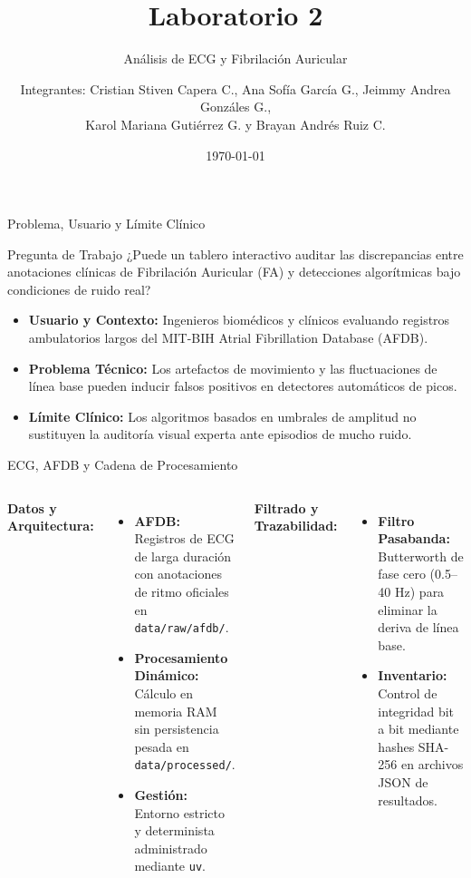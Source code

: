 \documentclass[aspectratio=169]{beamer}
\title{Laboratorio 2}
\subtitle{Análisis de ECG y Fibrilación Auricular}
\author{Integrantes: Cristian Stiven Capera C., Ana Sofía García G., Jeimmy Andrea Gonzáles G.,\\
Karol Mariana Gutiérrez G. y Brayan Andrés Ruiz C.}
\date{\today}
\begin{document}
\begin{frame}
    \titlepage
\end{frame}

\begin{frame}{Problema, Usuario y Límite Clínico}
    \begin{block}{Pregunta de Trabajo}
        ¿Puede un tablero interactivo auditar las discrepancias entre anotaciones clínicas de Fibrilación Auricular (FA) y detecciones algorítmicas bajo condiciones de ruido real?
    \end{block}
    \begin{itemize}
        \small
        \item \textbf{Usuario y Contexto:} Ingenieros biomédicos y clínicos evaluando registros ambulatorios largos del MIT-BIH Atrial Fibrillation Database (AFDB).
        \item \textbf{Problema Técnico:} Los artefactos de movimiento y las fluctuaciones de línea base pueden inducir falsos positivos en detectores automáticos de picos.
        \item \textbf{Límite Clínico:} Los algoritmos basados en umbrales de amplitud no sustituyen la auditoría visual experta ante episodios de mucho ruido.
    \end{itemize}
\end{frame}

\begin{frame}{ECG, AFDB y Cadena de Procesamiento}
    \begin{columns}[T]
        \textbf{Datos y Arquitectura:}
        \begin{itemize}
            \small
            \item \textbf{AFDB:} Registros de ECG de larga duración con anotaciones de ritmo oficiales en \texttt{data/raw/afdb/}.
            \item \textbf{Procesamiento Dinámico:} Cálculo en memoria RAM sin persistencia pesada en \texttt{data/processed/}.
            \item \textbf{Gestión:} Entorno estricto y determinista administrado mediante \texttt{uv}.
        \end{itemize}
        
        \textbf{Filtrado y Trazabilidad:}
        \begin{itemize}
            \small
            \item \textbf{Filtro Pasabanda:} Butterworth de fase cero (0.5--40 Hz) para eliminar la deriva de línea base.
            \item \textbf{Inventario:} Control de integridad bit a bit mediante hashes SHA-256 en archivos JSON de resultados.
        \end{itemize}
    \end{columns}
\end{frame}
\end{document}
